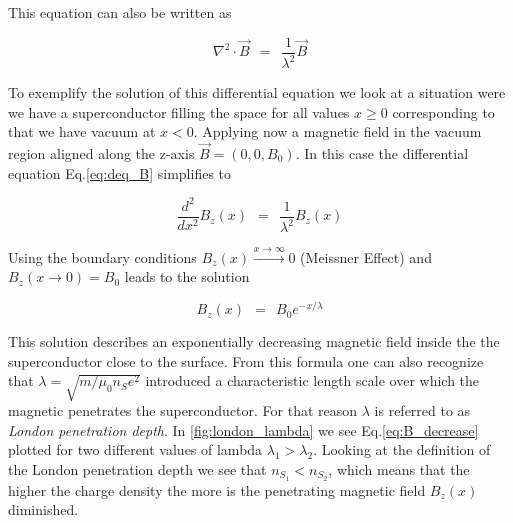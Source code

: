 \documentclass[10pt]{report}
\numberwithin{equation}{chapter}
\newcommand{\myEq}[1]{
  Eq.\ref{#1}
}
\begin{document}
This equation can also be written as

\begin{equation} \label{eq:deq_B}
  \nabla^2 \cdot \vec{B} ~~=~~ \frac{1}{\lambda^2} \vec{B}
\end{equation}



To exemplify the solution of this differential equation we look at a situation were we have a superconductor filling the space for all values $x\geq 0$ corresponding to that we have vacuum at $x<0$. Applying now a magnetic field in the vacuum region aligned along the z-axis $\vec{B} = (0,0,B_0)$. 
In this case the differential equation \myEq{eq:deq_B} simplifies to 

\begin{equation}
  \frac{d^2}{dx^2} B_z(x) ~~=~~ \frac{1}{\lambda^2} B_z(x)
\end{equation}

Using the boundary conditions $B_z(x) \xrightarrow{x \rightarrow \infty} 0$ (Meissner Effect) and $B_z(x \rightarrow 0)=B_0$ leads to the solution

\begin{equation} \label{eq:B_decrease}
  B_z(x) ~~=~~ B_0 e^{-x/\lambda}
\end{equation}

This solution describes an exponentially decreasing magnetic field inside the the superconductor close to the surface. From this formula one can also recognize that $\lambda = \sqrt{m/\mu_0 n_S e^2}$ introduced a characteristic length scale over which the magnetic penetrates the superconductor. For that reason $\lambda$ is referred to as \textit{London penetration depth}. 
In \ref{fig:london_lambda} we see \myEq{eq:B_decrease} plotted for two different values of lambda $\lambda_1 > \lambda_2$. 
Looking at the definition of the London penetration depth we see that $n_{S_1} < n_{S_2}$, which means that the higher the charge density the more is the penetrating magnetic field $B_z(x)$ diminished.
\end{document}
